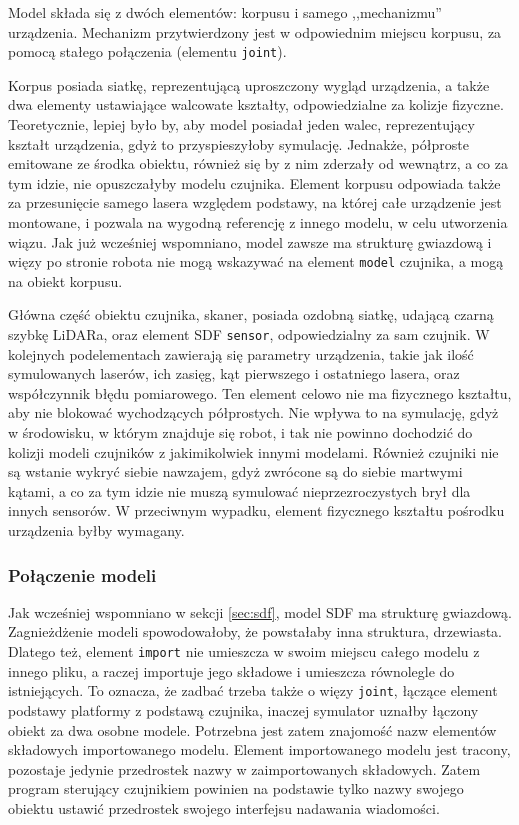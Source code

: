 		Model składa się z dwóch elementów: korpusu i samego ,,mechanizmu'' urządzenia.
		Mechanizm przytwierdzony jest w odpowiednim miejscu korpusu, za pomocą stałego połączenia (elementu \texttt{joint}).

		Korpus posiada siatkę, reprezentującą uproszczony wygląd urządzenia, a także dwa elementy ustawiające walcowate kształty, odpowiedzialne za kolizje fizyczne.
		Teoretycznie, lepiej było by, aby model posiadał jeden walec, reprezentujący kształt urządzenia, gdyż to przyspieszyłoby symulację. 
		Jednakże, półproste emitowane ze środka obiektu, również się by z nim zderzały od wewnątrz, a co za tym idzie, nie opuszczałyby modelu czujnika.
		Element korpusu odpowiada także za przesunięcie samego lasera względem podstawy, na której całe urządzenie jest montowane, i 
		pozwala na wygodną referencję z innego modelu, w celu utworzenia wiązu.
		Jak już wcześniej wspomniano, model zawsze ma strukturę gwiazdową i więzy po stronie robota nie mogą wskazywać na element \texttt{model} czujnika, a mogą
		na obiekt korpusu.

		Główna część obiektu czujnika, skaner, posiada ozdobną siatkę, udającą czarną szybkę LiDARa, oraz element SDF \texttt{sensor}, odpowiedzialny za sam czujnik.
		W kolejnych podelementach zawierają się parametry urządzenia, takie jak ilość symulowanych laserów, ich zasięg, kąt pierwszego i ostatniego lasera, oraz współczynnik błędu pomiarowego. Ten element celowo nie ma fizycznego kształtu, aby nie blokować wychodzących półprostych. 
		Nie wpływa to na symulację, gdyż w środowisku, w którym znajduje się robot, i tak nie powinno dochodzić do kolizji modeli czujników z jakimikolwiek innymi modelami.
		Również czujniki nie są wstanie wykryć siebie nawzajem, gdyż zwrócone są do siebie martwymi kątami, a co za tym idzie nie muszą symulować nieprzezroczystych brył dla
		innych sensorów.
		W przeciwnym wypadku, element fizycznego kształtu pośrodku urządzenia byłby wymagany.

		\subsubsection{Połączenie modeli}
			Jak wcześniej wspomniano w sekcji \ref{sec:sdf},
			model SDF ma strukturę gwiazdową. 
			Zagnieżdżenie modeli spowodowałoby, że powstałaby inna struktura, drzewiasta.
			Dlatego też, element \texttt{import} nie umieszcza w swoim miejscu całego modelu z innego pliku, a raczej importuje jego składowe i umieszcza równolegle do istniejących.
			To oznacza, że zadbać trzeba także o więzy \texttt{joint}, łączące element podstawy platformy z podstawą czujnika, inaczej symulator uznałby łączony obiekt za dwa osobne modele.
			Potrzebna jest zatem znajomość nazw elementów składowych importowanego modelu.
			Element importowanego modelu jest tracony, pozostaje jedynie przedrostek nazwy w zaimportowanych składowych.
			Zatem program sterujący czujnikiem powinien na podstawie tylko nazwy swojego obiektu ustawić przedrostek swojego interfejsu nadawania wiadomości.

